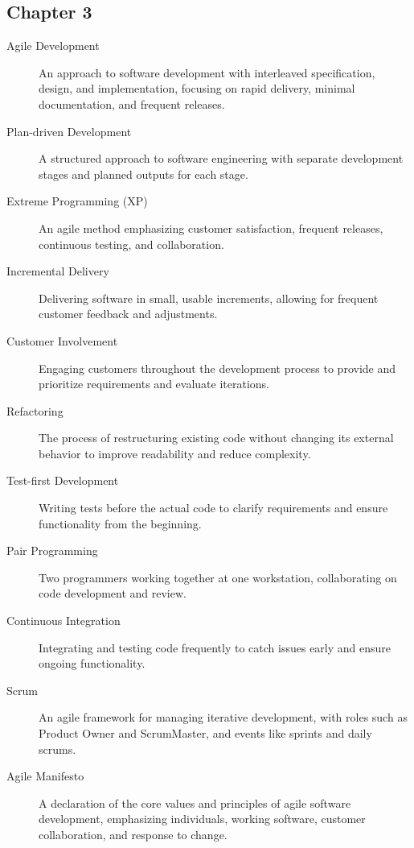 \documentclass{article}
\begin{document}
\subsection{Chapter 3}

\begin{description}
  \item[Agile Development] An approach to software development with interleaved specification, design, and implementation, focusing on rapid delivery, minimal documentation, and frequent releases.
  
  \item[Plan-driven Development] A structured approach to software engineering with separate development stages and planned outputs for each stage.
  
  \item[Extreme Programming (XP)] An agile method emphasizing customer satisfaction, frequent releases, continuous testing, and collaboration.
  
  \item[Incremental Delivery] Delivering software in small, usable increments, allowing for frequent customer feedback and adjustments.
  
  \item[Customer Involvement] Engaging customers throughout the development process to provide and prioritize requirements and evaluate iterations.
  
  \item[Refactoring] The process of restructuring existing code without changing its external behavior to improve readability and reduce complexity.
  
  \item[Test-first Development] Writing tests before the actual code to clarify requirements and ensure functionality from the beginning.
  
  \item[Pair Programming] Two programmers working together at one workstation, collaborating on code development and review.
  
  \item[Continuous Integration] Integrating and testing code frequently to catch issues early and ensure ongoing functionality.
  
  \item[Scrum] An agile framework for managing iterative development, with roles such as Product Owner and ScrumMaster, and events like sprints and daily scrums.
  
  \item[Agile Manifesto] A declaration of the core values and principles of agile software development, emphasizing individuals, working software, customer collaboration, and response to change.
  

\end{description}
\end{document}
